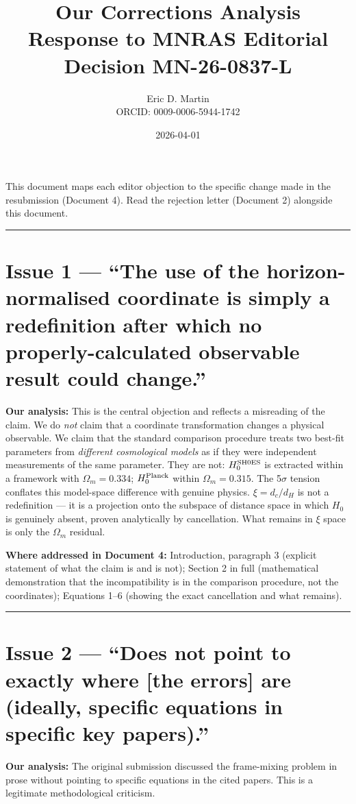 \documentclass[12pt,a4paper]{article}
\title{\textbf{Our Corrections Analysis}\\
\large Response to MNRAS Editorial Decision MN-26-0837-L}
\author{Eric D. Martin \\ ORCID: 0009-0006-5944-1742}
\date{2026-04-01}
\begin{document}
\maketitle

This document maps each editor objection to the specific change made
in the resubmission (Document 4). Read the rejection letter
(Document 2) alongside this document.

\bigskip
\hrule
\bigskip

\section*{Issue 1 — ``The use of the horizon-normalised coordinate is
simply a redefinition after which no properly-calculated observable
result could change.''}

\textbf{Our analysis:} This is the central objection and reflects a
misreading of the claim. We do \emph{not} claim that a coordinate
transformation changes a physical observable. We claim that the
standard comparison procedure treats two best-fit parameters from
\emph{different cosmological models} as if they were independent
measurements of the same parameter. They are not: $H_0^{\rm SH0ES}$
is extracted within a framework with $\Omega_m = 0.334$;
$H_0^{\rm Planck}$ within $\Omega_m = 0.315$. The 5$\sigma$ tension
conflates this model-space difference with genuine physics.
$\xi = d_c/d_H$ is not a redefinition --- it is a projection onto
the subspace of distance space in which $H_0$ is genuinely absent,
proven analytically by cancellation. What remains in $\xi$ space is
only the $\Omega_m$ residual.

\textbf{Where addressed in Document 4:}
Introduction, paragraph 3 (explicit statement of what the claim is
and is not); Section 2 in full (mathematical demonstration that the
incompatibility is in the comparison procedure, not the coordinates);
Equations 1--6 (showing the exact cancellation and what remains).

\bigskip
\hrule
\bigskip

\section*{Issue 2 — ``Does not point to exactly where [the errors]
are (ideally, specific equations in specific key papers).''}

\textbf{Our analysis:} The original submission discussed the
frame-mixing problem in prose without pointing to specific equations
in the cited papers. This is a legitimate methodological criticism.
\end{document}
